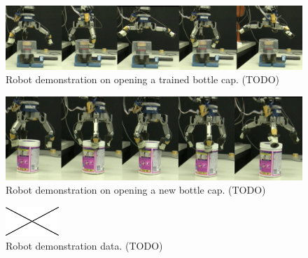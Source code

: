 \documentclass[preprint,12pt]{elsarticle}
\begin{document}

\begin{figure}
  \centering
  \includegraphics[width=15cm]{./fig/demo_train.jpg}
  \caption{ \scriptsize{Robot demonstration on opening a trained bottle cap. (TODO)}
}
\label{fig:demo_train}
\end{figure}

\begin{figure}
  \centering
  \includegraphics[width=15cm]{./fig/demo_new.jpg}
  \caption{ \scriptsize{Robot demonstration on opening a new bottle cap. (TODO)}
}
\label{fig:demo_new}
\end{figure}

\begin{figure}
  \centering
  \includegraphics[width=2cm]{./fig/void.jpg}
  \caption{ \scriptsize{Robot demonstration data. (TODO)}
}
\label{fig:demo_result}
\end{figure}
\end{document}

